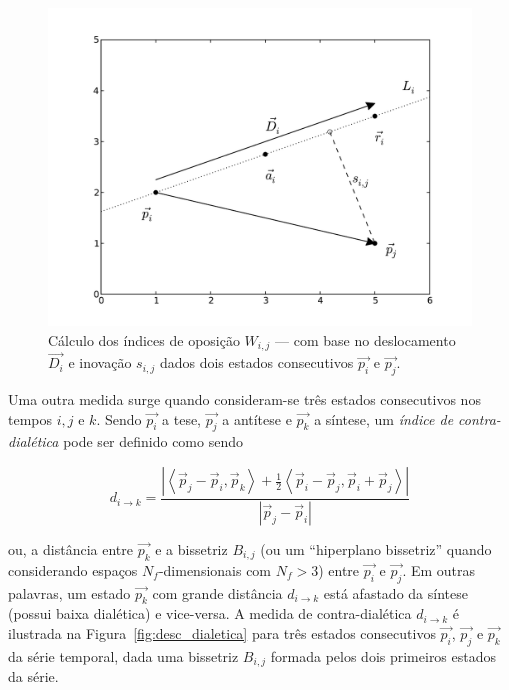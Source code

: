 \begin{figure}[ht!]
\begin{center}
        \includegraphics[scale=.6]{figs/desc_opos.pdf}
      \caption{Cálculo dos índices de oposição $W_{i,j}$ --- com base
        no deslocamento $\vec{D_i}$ e inovação $s_{i,j}$ dados dois
        estados consecutivos $\vec{p_i}$ e $\vec{p_j}$.}
        \label{fig:desc_opos_inov}
\end{center}
\end{figure}

Uma outra medida surge quando consideram-se três estados consecutivos nos tempos
$i,j$ e $k$. Sendo $\vec{p_i}$ a tese, $\vec{p_j}$ a antítese e $\vec{p_k}$ a
síntese, um \emph{índice de contra-dialética} pode ser definido como sendo


\begin{equation}
d_{i \rightarrow k} = 
      \frac{|\left< \vec{p}_j-\vec{p}_i,\vec{p}_k \right> + 
        \frac{1}{2}\left<\vec{p}_i-\vec{p}_j, \vec{p}_i+\vec{p}_j\right>|}
           {|\vec{p}_j-\vec{p}_i|}
\end{equation}

\noindent ou, a distância entre $\vec{p_k}$ e a bissetriz $B_{i,j}$
(ou um ``hiperplano bissetriz'' quando considerando espaços
$N_f$-dimensionais com $N_f>3$) entre $\vec{p_i}$ e $\vec{p_j}$. Em
outras palavras, um estado $\vec{p_k}$ com grande distância $d_{i
  \rightarrow k}$ está afastado da síntese (possui baixa dialética) e
vice-versa. A medida de contra-dialética $d_{i \rightarrow k}$ é
ilustrada na Figura~\ref{fig:desc_dialetica} para três estados
consecutivos $\vec{p_i}$, $\vec{p_j}$ e $\vec{p_k}$ da série temporal,
dada uma bissetriz $B_{i,j}$ formada pelos dois primeiros estados da
série.


